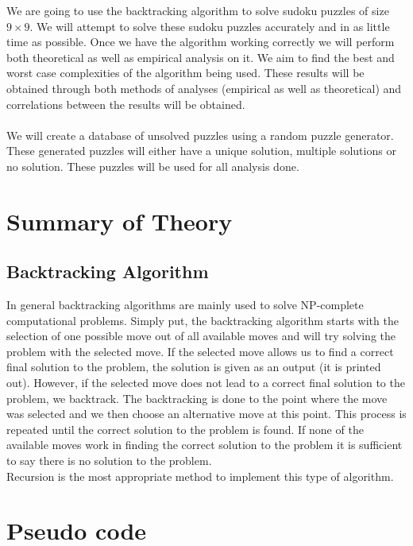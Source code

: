 \documentclass[12pt,a4paper,titlepage]{article}
\begin{document}
We are going to use the backtracking algorithm to solve sudoku puzzles of size $9\times 9$. We will attempt to solve these sudoku puzzles accurately and in as little time as possible. Once we have the algorithm working correctly we will perform both theoretical as well as empirical analysis on it. We aim to find the best and worst case complexities of the algorithm being used. These results will be obtained through both methods of analyses (empirical as well as theoretical) and correlations between the results will be obtained.
\\
\\
We will create a database of unsolved puzzles using a random puzzle generator. These generated puzzles will either have a unique solution, multiple solutions or no solution. These puzzles will be used for all analysis done. 
\\

\section{Summary of Theory}

\subsection{Backtracking Algorithm}

In general backtracking algorithms are mainly used to solve NP-complete computational problems. Simply put, the backtracking algorithm starts with the selection of one possible move out of all available moves and will try solving the problem with the selected move. If the selected move allows us to find a correct final solution to the problem, the solution is given as an output (it is printed out). However, if the selected move does not lead to a correct final solution to the problem, we backtrack. The backtracking is done to the point where the move was selected and we then choose an alternative move at this point. This process is repeated until the correct solution to the problem is found. If none of the available moves work in finding the correct solution to the problem it is sufficient to say there is no solution to the problem.
\\
Recursion is the most appropriate method to implement this type of algorithm.


\section{Pseudo code}
\end{document}
